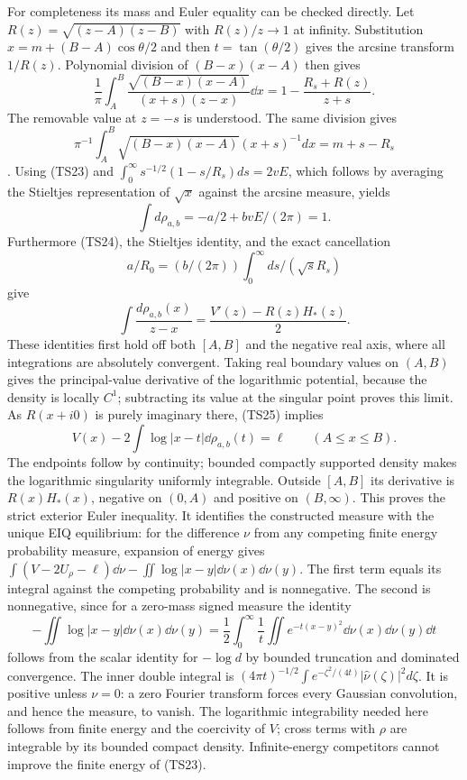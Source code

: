 \documentclass[11pt,a4paper]{article}
\begin{document}
For completeness its mass and Euler equality can be checked directly.
Let $R(z)=\sqrt{(z-A)(z-B)}$ with $R(z)/z\to1$ at infinity.
Substitution $x=m+(B-A)\cos\theta/2$ and then
$t=\tan(\theta/2)$ gives the arcsine transform $1/R(z)$.
Polynomial division of $(B-x)(x-A)$ then gives
\begin{equation}\tag{TS24}
 \frac1\pi\int_A^B\frac{\sqrt{(B-x)(x-A)}}{(x+s)(z-x)}\dd x
 =1-\frac{R_s+R(z)}{z+s}.
\end{equation}
The removable value at $z=-s$ is understood. The same division gives
\[\pi^{-1}\int_A^B\sqrt{(B-x)(x-A)}(x+s)^{-1}dx=m+s-R_s\].
Using (TS23) and $\int_0^\infty s^{-1/2}(1-s/R_s)ds=2vE$,
which follows by averaging the Stieltjes representation of $\sqrt x$
against the arcsine measure, yields
\[
 \int d\rho_{a,b}=-a/2+bvE/(2\pi)=1.
\]
Furthermore (TS24), the Stieltjes identity, and the exact cancellation
\[a/R_0=(b/(2\pi))\int_0^\infty ds/(\sqrt sR_s)\] give
\begin{equation}\tag{TS25}
 \int\frac{d\rho_{a,b}(x)}{z-x}
 =\frac{V'(z)-R(z)H_*(z)}2.
\end{equation}
These identities first hold off both $[A,B]$ and the negative real
axis, where all integrations are absolutely convergent. Taking real
boundary values on $(A,B)$ gives the principal-value derivative
of the logarithmic potential, because the density is locally $C^1$;
subtracting its value at the singular point proves this limit.
As $R(x+i0)$ is purely imaginary there, (TS25) implies
\begin{equation}\tag{TS26}
 V(x)-2\int\log|x-t|\dd\rho_{a,b}(t)=\ell\qquad(A\leq x\leq B).
\end{equation}
The endpoints follow by continuity; bounded compactly supported
density makes the logarithmic singularity uniformly integrable.
Outside $[A,B]$ its derivative is $R(x)H_*(x)$, negative on $(0,A)$
and positive on $(B,\infty)$. This proves the strict exterior Euler
inequality. It identifies the constructed measure with the unique
EIQ equilibrium: for the difference $\nu$ from any competing finite
energy probability measure, expansion of energy gives
$\int(V-2U_\rho-\ell)\dd\nu-\iint\log|x-y|\dd\nu(x)\dd\nu(y)$.
The first term equals its integral against the competing probability
and is nonnegative. The second is nonnegative, since for a zero-mass
signed measure the identity
\[
 -\iint\log|x-y|\dd\nu(x)\dd\nu(y)
 =\frac12\int_0^\infty\frac1t
       \iint e^{-t(x-y)^2}\dd\nu(x)\dd\nu(y)\dd t
\]
follows from the scalar identity for $-\log d$ by bounded truncation
and dominated convergence. The inner double integral is
$(4\pi t)^{-1/2}\int e^{-\zeta^2/(4t)}|\widehat\nu(\zeta)|^2d\zeta$.
It is positive unless $\nu=0$: a zero Fourier transform forces every
Gaussian convolution, and hence the measure, to vanish. The
logarithmic integrability needed here follows from finite energy and
the coercivity of $V$; cross terms with $\rho$ are integrable by its
bounded compact density. Infinite-energy competitors cannot improve
the finite energy of (TS23).
\end{document}
